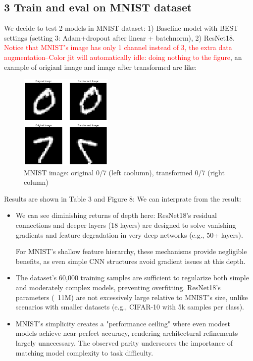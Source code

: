 \documentclass{article}
\newcommand{\subs}[1]{\subsection*{#1}}
\begin{document}
\subs{3 Train and eval on MNIST dataset}
We decide to test 2 models in MNIST dataset: 1) Baseline model with BEST settings (setting 3: Adam+dropout after linear + batchnorm), 2) ResNet18. 
\textcolor{red}{Notice that MNIST's image has only 1 channel instead of 3, the extra data augmentation--Color jit will automatically idle: doing nothing to the figure}, an example of origianl image and image after transformed are like:

\begin{figure}[hbtp]
  \centering
  
  \includegraphics[width=0.4\textwidth]{fig/mnist.png} %
  
  \caption{MNIST image: original 0/7 (left coolumn), transformed 0/7 (right column)} %
  \label{fig:curve} %
\end{figure}

\noindent Results are shown in Table 3 and Figure 8:
\noindent We can interprate from the result:
\begin{itemize}
  \item We can see diminishing returns of depth here:
  ResNet18's residual connections and deeper layers (18 layers) are designed to solve vanishing gradients and feature degradation in very deep networks (e.g., 50+ layers).
  
  For MNIST's shallow feature hierarchy, these mechanisms provide negligible benefits, as even simple CNN structures avoid gradient issues at this depth.
  \item The dataset's 60,000 training samples are sufficient to regularize both simple and moderately complex models, preventing overfitting. 
  ResNet18's parameters (~11M) are not excessively large relative to MNIST's size, unlike scenarios with smaller datasets (e.g., CIFAR-10 with 5k samples per class).
  \item MNIST's simplicity creates a "performance ceiling" where even modest models achieve near-perfect accuracy, rendering architectural refinements largely unnecessary. The observed parity underscores the importance of matching model complexity to task difficulty.
\end{itemize}
\end{document}
